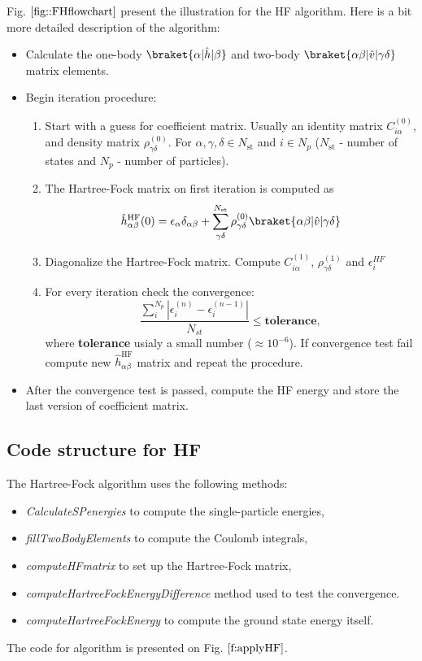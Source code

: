 Fig. $\ref{fig::FHflowchart}$ present the illustration for the HF algorithm. Here is a bit more detailed description of the algorithm:
\begin{tcolorbox}
	\begin{itemize}
		\item Calculate the one-body $\braket{\alpha|\hat{h}|\beta}$ and two-body $\braket{\alpha\beta|\hat{v}|\gamma\delta}$ matrix elements.  \\
		\item Begin iteration procedure:
		\begin{enumerate}
			\item Start with a guess for coefficient matrix. Usually an identity matrix $C^{(0)}_{i\alpha}$,  and density matrix $\rho^{(0)}_{\gamma\delta}$. For $\alpha, \gamma, \delta \in N_{\text{st}}$ and $i \in N_{p}$ ($N_{\text{st}}$ - number of states and $N_{p}$ - number of particles). 
			\item The Hartree-Fock matrix on first iteration is computed as 
			 \[ \hat{h}^{\text{HF}}_{\alpha \beta}(0) = \epsilon_\alpha \delta_{\alpha\beta} + \sum_{\gamma\delta}^{N_{\text{st}}} \rho^{(0)}_{\gamma\delta} \braket{\alpha\beta|\hat{v}|\gamma\delta}  \] 
			 \item Diagonalize the Hartree-Fock matrix. Compute  $C^{(1)}_{i\alpha}$,   $\rho^{(1)}_{\gamma\delta}$ and $\epsilon_i^{HF}$
			 \item For every iteration check the convergence:
			 \[\frac{\sum_{i}^{N_p} |\epsilon_i^{(n)}- \epsilon_i^{(n-1)}|}{N_{st}} \leq \textbf{tolerance},\]
			 where \textbf{tolerance} usialy a small number ($\approx 10^{-6}$). If convergence test fail compute new $\hat{h}^{\text{HF}}_{\alpha \beta}$ matrix and repeat the procedure.			 	
		\end{enumerate} 
		\item After the convergence test is passed, compute the HF energy and store the last version of coefficient matrix. 
	\end{itemize}
\end{tcolorbox}

\subsection{Code structure for HF}\label{sec:code_for_HF}
The Hartree-Fock algorithm uses the following methods:
\begin{itemize}
\item \textit{CalculateSPenergies} to compute the single-particle energies,
\item \textit{fillTwoBodyElements} to compute the Coulomb integrals,
\item \textit{computeHFmatrix} to set up the Hartree-Fock matrix,
\item \textit{computeHartreeFockEnergyDifference} method used to test the convergence.
\item \textit{computeHartreeFockEnergy} to compute the ground state energy itself.
\end{itemize}
The code for algorithm is presented on Fig. $\ref{f:applyHF}$.
 
